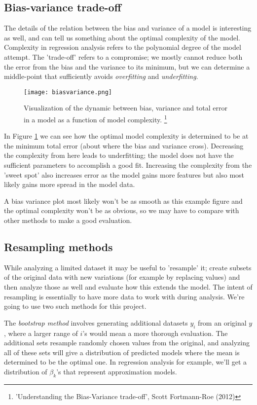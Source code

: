 \documentclass[reprint,english,notitlepage]{revtex4-1}  %
\begin{document}
\subsection{Bias-variance trade-off}

The details of the relation between the bias and variance of a model is interesting as well, and can tell us something about the optimal complexity of the model. Complexity in regression analysis refers to the polynomial degree of the model attempt. The 'trade-off' refers to a compromise; we mostly cannot reduce both the error from the bias and the variance to its minimum, but we can determine a middle-point that sufficiently avoids \textit{overfitting} and \textit{underfitting}.

\begin{figure}[h!]
    \centering
    \texttt{[image: biasvariance.png]}
    \caption{Visualization of the dynamic between bias, variance and total error in a model as a function of model complexity. \footnote{'Understanding the Bias-Variance trade-off', Scott Fortmann-Roe (2012)}}
    \label{fig:bv2}
\end{figure}

In Figure \ref{fig:bv2} we can see how the optimal model complexity is determined to be at the minimum total error (about where the bias and variance cross). Decreasing the complexity from here leads to underfitting; the model does not have the sufficient parameters to accomplish a good fit. Increasing the complexity from the 'sweet spot' also increases error as the model gains more features but also most likely gains more spread in the model data.

A bias variance plot most likely won't be as smooth as this example figure and the optimal complexity won't be as obvious, so we may have to compare with other methods to make a good evaluation.

\subsection{Resampling methods}

While analyzing a limited dataset it may be useful to 'resample' it; create subsets of the original data with new variations (for example by replacing values) and then analyze those as well and evaluate how this extends the model. The intent of resampling is essentially to have more data to work with during analysis. We're going to use two such methods for this project.

The \textit{bootstrap method} involves generating additional datasets $y_i$ from an original $y$, where a larger range of $i$'s would mean a more thorough evaluation. The additional sets resample randomly chosen values from the original, and analyzing all of these sets will give a distribution of predicted models where the mean is determined to be the optimal one. In regression analysis for example, we'll get a distribution of $\beta_k$'s that represent approximation models.
\end{document}
